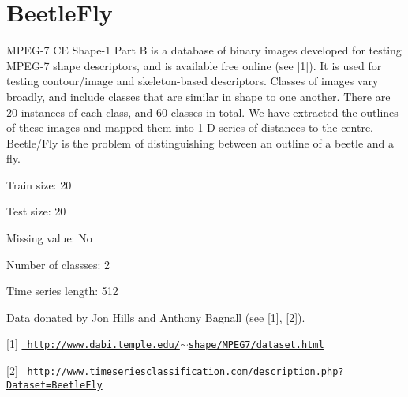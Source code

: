 \chapter{Beetle\+Fly}
\hypertarget{md_external_2data_2UCRArchive__2018_2BeetleFly_2README}{}\label{md_external_2data_2UCRArchive__2018_2BeetleFly_2README}
\label{md_external_2data_2UCRArchive__2018_2BeetleFly_2README_autotoc_md22}%
%
 MPEG-\/7 CE Shape-\/1 Part B is a database of binary images developed for testing MPEG-\/7 shape descriptors, and is available free online (see \mbox{[}1\mbox{]}). It is used for testing contour/image and skeleton-\/based descriptors. Classes of images vary broadly, and include classes that are similar in shape to one another. There are 20 instances of each class, and 60 classes in total. We have extracted the outlines of these images and mapped them into 1-\/D series of distances to the centre. Beetle/\+Fly is the problem of distinguishing between an outline of a beetle and a fly.

Train size\+: 20

Test size\+: 20

Missing value\+: No

Number of classses\+: 2

Time series length\+: 512

Data donated by Jon Hills and Anthony Bagnall (see \mbox{[}1\mbox{]}, \mbox{[}2\mbox{]}).

\mbox{[}1\mbox{]} \href{http://www.dabi.temple.edu/~shape/MPEG7/dataset.html}{\texttt{ http\+://www.\+dabi.\+temple.\+edu/\texorpdfstring{$\sim$}{\string~}shape/\+MPEG7/dataset.\+html}}

\mbox{[}2\mbox{]} \href{http://www.timeseriesclassification.com/description.php?Dataset=BeetleFly}{\texttt{ http\+://www.\+timeseriesclassification.\+com/description.\+php?\+Dataset=\+Beetle\+Fly}} 